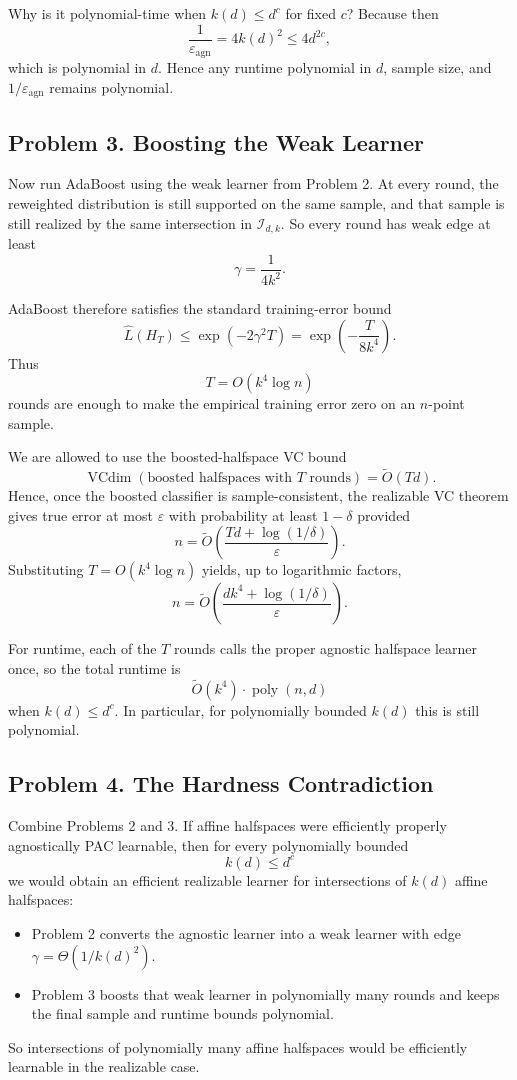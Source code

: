 \documentclass{article}
\DeclareMathOperator{\VC}{VCdim}
\newcommand{\cI}{\mathcal{I}}
\begin{document}
Why is it polynomial-time when $k(d)\le d^c$ for fixed $c$? Because then
$$
\frac{1}{\varepsilon_{\mathrm{agn}}}=4k(d)^2\le 4d^{2c},
$$
which is polynomial in $d$. Hence any runtime polynomial in $d$, sample size, and $1/\varepsilon_{\mathrm{agn}}$ remains polynomial.

\subsection{Problem 3. Boosting the Weak Learner}

Now run AdaBoost using the weak learner from Problem 2. At every round, the reweighted distribution is still supported on the same sample, and that sample is still realized by the same intersection in $\cI_{d,k}$. So every round has weak edge at least
$$
\gamma = \frac{1}{4k^2}.
$$

AdaBoost therefore satisfies the standard training-error bound
$$
\widehat{L}(H_T)
\le
\exp(-2\gamma^2 T)
=
\exp\!\left(-\frac{T}{8k^4}\right).
$$
Thus
$$
T=O(k^4\log n)
$$
rounds are enough to make the empirical training error zero on an $n$-point sample.

We are allowed to use the boosted-halfspace VC bound
$$
\VC(\text{boosted halfspaces with }T\text{ rounds})
=
\widetilde{O}(Td).
$$
Hence, once the boosted classifier is sample-consistent, the realizable VC theorem gives true error at most $\varepsilon$ with probability at least $1-\delta$ provided
$$
n
=
\widetilde{O}\!\left(
\frac{
Td+\log(1/\delta)
}{
\varepsilon
}
\right).
$$
Substituting $T=O(k^4\log n)$ yields, up to logarithmic factors,
$$
n
=
\widetilde{O}\!\left(
\frac{
dk^4+\log(1/\delta)
}{
\varepsilon
}
\right).
$$

For runtime, each of the $T$ rounds calls the proper agnostic halfspace learner once, so the total runtime is
$$
\widetilde{O}(k^4)\cdot \operatorname{poly}(n,d)
$$
when $k(d)\le d^c$. In particular, for polynomially bounded $k(d)$ this is still polynomial.

\subsection{Problem 4. The Hardness Contradiction}

Combine Problems 2 and 3. If affine halfspaces were efficiently properly agnostically PAC learnable, then for every polynomially bounded
$$
k(d)\le d^c
$$
we would obtain an efficient realizable learner for intersections of $k(d)$ affine halfspaces:
\begin{itemize}
\item Problem 2 converts the agnostic learner into a weak learner with edge $\gamma=\Theta(1/k(d)^2)$.
\item Problem 3 boosts that weak learner in polynomially many rounds and keeps the final sample and runtime bounds polynomial.
\end{itemize}
So intersections of polynomially many affine halfspaces would be efficiently learnable in the realizable case.
\end{document}
